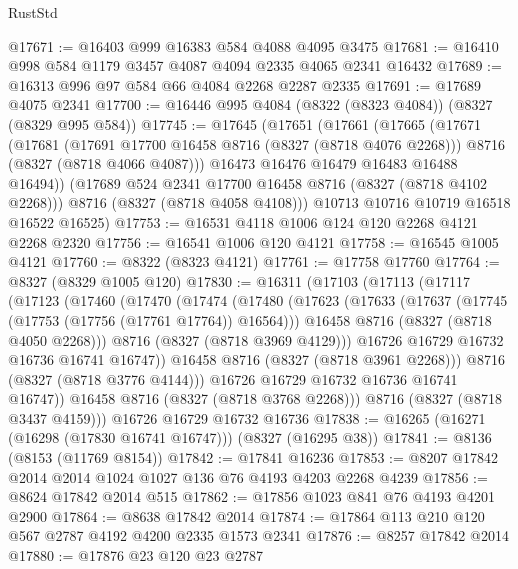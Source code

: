 \begin{lexlean}{RustStd}
\begin{coremodule}
@17671 := @16403 @999 @16383 @584 @4088 @4095 @3475
@17681 := @16410 @998 @584 @1179 @3457 @4087 @4094 @2335 @4065 @2341 @16432
@17689 := @16313 @996 @97 @584 @66 @4084 @2268 @2287 @2335
@17691 := @17689 @4075 @2341
@17700 := @16446 @995 @4084 (@8322 (@8323 @4084)) (@8327 (@8329 @995 @584))
@17745 := @17645
    (@17651
      (@17661
        (@17665
          (@17671
            (@17681
              (@17691 @17700 @16458 @8716 (@8327 (@8718 @4076 @2268)))
              @8716
              (@8327 (@8718 @4066 @4087)))
            @16473
            @16476
            @16479
            @16483
            @16488
            @16494))
        (@17689 @524 @2341 @17700 @16458 @8716 (@8327 (@8718 @4102 @2268)))
        @8716
        (@8327 (@8718 @4058 @4108)))
      @10713
      @10716
      @10719
      @16518
      @16522
      @16525)
@17753 := @16531 @4118 @1006 @124 @120 @2268 @4121 @2268 @2320
@17756 := @16541 @1006 @120 @4121
@17758 := @16545 @1005 @4121
@17760 := @8322 (@8323 @4121)
@17761 := @17758 @17760
@17764 := @8327 (@8329 @1005 @120)
@17830 := @16311
    (@17103
      (@17113
        (@17117
          (@17123
            (@17460
              (@17470
                (@17474
                  (@17480
                    (@17623
                      (@17633
                        (@17637 (@17745 (@17753 (@17756 (@17761 @17764)) @16564)))
                        @16458
                        @8716
                        (@8327 (@8718 @4050 @2268)))
                      @8716
                      (@8327 (@8718 @3969 @4129)))
                    @16726
                    @16729
                    @16732
                    @16736
                    @16741
                    @16747))
                @16458
                @8716
                (@8327 (@8718 @3961 @2268)))
              @8716
              (@8327 (@8718 @3776 @4144)))
            @16726
            @16729
            @16732
            @16736
            @16741
            @16747))
        @16458
        @8716
        (@8327 (@8718 @3768 @2268)))
      @8716
      (@8327 (@8718 @3437 @4159)))
    @16726
    @16729
    @16732
    @16736
@17838 := @16265 (@16271 (@16298 (@17830 @16741 @16747))) (@8327 (@16295 @38))
@17841 := @8136 (@8153 (@11769 @8154))
@17842 := @17841 @16236
@17853 := @8207 @17842 @2014 @2014 @1024 @1027 @136 @76 @4193 @4203 @2268 @4239
@17856 := @8624 @17842 @2014 @515
@17862 := @17856 @1023 @841 @76 @4193 @4201 @2900
@17864 := @8638 @17842 @2014
@17874 := @17864 @113 @210 @120 @567 @2787 @4192 @4200 @2335 @1573 @2341
@17876 := @8257 @17842 @2014
@17880 := @17876 @23 @120 @23 @2787

\end{coremodule}
\end{lexlean}
